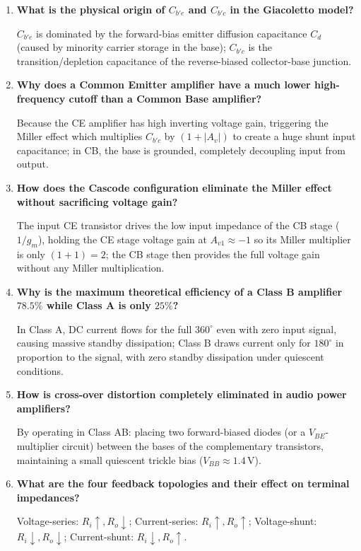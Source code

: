 \documentclass[12pt,a4paper]{article}
\newcommand{\Q}[1]{\textbf{#1}\par\noindent\ignorespaces}
\begin{document}
\begin{tcolorbox}[exambox, title={Frequently Asked / Viva Questions}]
\begin{enumerate}[topsep=0pt, label=\textbf{Q\arabic*.}, itemsep=5pt]
  \item \Q{What is the physical origin of $C_{b'e}$ and $C_{b'c}$ in the Giacoletto model?}
  $C_{b'e}$ is dominated by the forward-bias emitter diffusion capacitance $C_d$ (caused by minority carrier storage in the base); $C_{b'c}$ is the transition/depletion capacitance of the reverse-biased collector-base junction.

  \item \Q{Why does a Common Emitter amplifier have a much lower high-frequency cutoff than a Common Base amplifier?}
  Because the CE amplifier has high inverting voltage gain, triggering the Miller effect which multiplies $C_{b'c}$ by $(1+|A_v|)$ to create a huge shunt input capacitance; in CB, the base is grounded, completely decoupling input from output.

  \item \Q{How does the Cascode configuration eliminate the Miller effect without sacrificing voltage gain?}
  The input CE transistor drives the low input impedance of the CB stage ($1/g_m$), holding the CE stage voltage gain at $A_{v1} \approx -1$ so its Miller multiplier is only $(1+1)=2$; the CB stage then provides the full voltage gain without any Miller multiplication.

  \item \Q{Why is the maximum theoretical efficiency of a Class B amplifier $78.5\%$ while Class A is only $25\%$?}
  In Class A, DC current flows for the full $360^\circ$ even with zero input signal, causing massive standby dissipation; Class B draws current only for $180^\circ$ in proportion to the signal, with zero standby dissipation under quiescent conditions.

  \item \Q{How is cross-over distortion completely eliminated in audio power amplifiers?}
  By operating in Class AB: placing two forward-biased diodes (or a $V_{BE}$-multiplier circuit) between the bases of the complementary transistors, maintaining a small quiescent trickle bias ($V_{BB} \approx 1.4\,\mathrm{V}$).

  \item \Q{What are the four feedback topologies and their effect on terminal impedances?}
  Voltage-series: $R_i \uparrow, R_o \downarrow$; Current-series: $R_i \uparrow, R_o \uparrow$; Voltage-shunt: $R_i \downarrow, R_o \downarrow$; Current-shunt: $R_i \downarrow, R_o \uparrow$.


\end{enumerate}
\end{tcolorbox}
\end{document}
